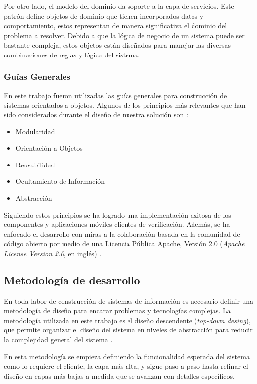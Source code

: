 Por otro lado, el modelo del dominio da soporte a la capa de servicios.
Este patrón define objetos de dominio que tienen incorporados datos
y comportamiento, estos representan de manera significativa el dominio
del problema a resolver. Debido a que la lógica de negocio de un sistema
puede ser bastante compleja, estos objetos están diseñados para manejar
las diversas combinaciones de reglas y lógica del sistema.

\subsubsection{Guías Generales}

En este trabajo fueron utilizadas las guías generales para construcción
de sistemas orientados a objetos. Algunos de los principios más relevantes
que han sido considerados durante el diseño de nuestra solución son
\cite{Albin2003}:
\begin{itemize}
\item Modularidad
\item Orientación a Objetos
\item Reusabilidad
\item Ocultamiento de Información
\item Abstracción
\end{itemize}
Siguiendo estos principios se ha logrado una implementación exitosa
de los componentes y aplicaciones móviles clientes de verificación.
Además, se ha enfocado el desarrollo con miras a la colaboración basada
en la comunidad de código abierto por medio de una Licencia Pública
Apache, Versión 2.0 (\emph{Apache License Version 2.0}, en inglés)
\cite{GimenezYegros2016c}.

\subsection{Metodología de desarrollo}

\label{ssec52:metodologia}En toda labor de construcción de sistemas
de información es necesario definir una metodología de diseño para
encarar problemas y tecnologías complejas. La metodología utilizada
en este trabajo es el diseño descendente (\emph{top-down desing}),
que permite organizar el diseño del sistema en niveles de abstracción
para reducir la complejidad general del sistema \cite{Albin2003}. 

En esta metodología se empieza definiendo la funcionalidad esperada
del sistema como lo requiere el cliente, la capa más alta, y sigue
paso a paso hasta refinar el diseño en capas más bajas a medida que
se avanzan con detalles específicos. 

